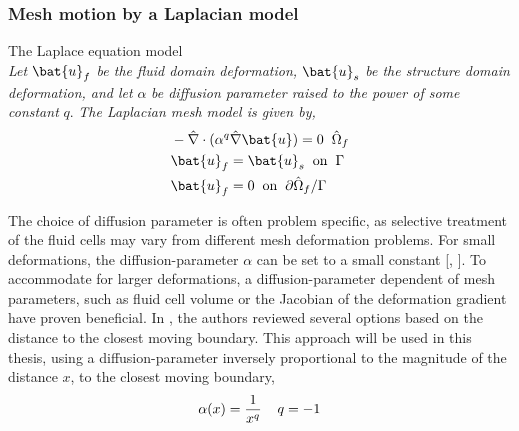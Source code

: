 \subsubsection*{Mesh motion by a Laplacian model}
\begin{equat}
The Laplace equation model \\ \textit{Let} $\bat{u}_f$ \textit{be the fluid domain deformation,} $\bat{u}_s$ \textit{be the structure domain deformation, and let} $\alpha$ \textit{be diffusion parameter raised to the power of some constant} $q$. \textit{The Laplacian  mesh model is given by, }   
\begin{align*}
&- \hat{\nabla} \cdot (\alpha^q \hat{\nabla} \bat{u}) = 0 \hspace{2mm} \hat{\Omega}_f\\
&\bat{u}_f = \bat{u}_s \hspace{2mm} \text{on} \hspace{2mm}  \Gamma \\
&\bat{u}_f = 0 \hspace{2mm} \text{on} \hspace{2mm} \partial \hat{\Omega}_f / \Gamma 
\end{align*}
\end{equat}
The choice of diffusion parameter  is often problem specific, as selective treatment of the fluid cells may vary from different mesh deformation problems. For small deformations, the diffusion-parameter $\alpha$ can be set to a small constant [\cite{Wick2013}, \cite{Richter2010c}]. To accommodate for larger deformations, a diffusion-parameter dependent of mesh parameters, such as fluid cell volume \cite{Crumpton1995} or the Jacobian of the deformation gradient \cite{Stein} have proven beneficial. In \cite{Jasak2006}, the authors reviewed several options based on the distance to the closest moving boundary. This approach will be used in this thesis, using a diffusion-parameter inversely proportional to the magnitude of the distance $x$, to the closest moving boundary,
\begin{align*}
\alpha(x) = \frac{1}{x^q}  \hspace{4mm} q = -1
\end{align*}
